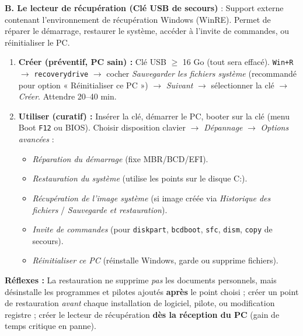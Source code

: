 \documentclass[11pt]{article}
\begin{document}
\begin{methode}
\textbf{B. Le lecteur de récupération (Clé USB de secours)} : Support externe contenant l'environnement de récupération Windows (WinRE). Permet de réparer le démarrage, restaurer le système, accéder à l'invite de commandes, ou réinitialiser le PC.
\begin{enumerate}
  \item \textbf{Créer (préventif, PC sain) :} Clé USB $\ge$ 16 Go (tout sera effacé). \texttt{Win+R} $\rightarrow$ \texttt{recoverydrive} $\rightarrow$ cocher \emph{Sauvegarder les fichiers système} (recommandé pour option « Réinitialiser ce PC ») $\rightarrow$ \emph{Suivant} $\rightarrow$ sélectionner la clé $\rightarrow$ \emph{Créer}. Attendre 20--40 min.
  \item \textbf{Utiliser (curatif) :} Insérer la clé, démarrer le PC, booter sur la clé (menu Boot \texttt{F12} ou BIOS). Choisir disposition clavier $\rightarrow$ \emph{Dépannage} $\rightarrow$ \emph{Options avancées} :
        \begin{itemize}
          \item \emph{Réparation du démarrage} (fixe MBR/BCD/EFI).
          \item \emph{Restauration du système} (utilise les points sur le disque C:).
          \item \emph{Récupération de l'image système} (si image créée via \emph{Historique des fichiers} / \emph{Sauvegarde et restauration}).
          \item \emph{Invite de commandes} (pour \texttt{diskpart}, \texttt{bcdboot}, \texttt{sfc}, \texttt{dism}, \texttt{copy} de secours).
          \item \emph{Réinitialiser ce PC} (réinstalle Windows, garde ou supprime fichiers).
        \end{itemize}
\end{enumerate}

\textbf{Réflexes :} La restauration ne supprime \emph{pas} les documents personnels, mais désinstalle les programmes et pilotes ajoutés \textbf{après} le point choisi ; créer un point de restauration \emph{avant} chaque installation de logiciel, pilote, ou modification registre ; créer le lecteur de récupération \textbf{dès la réception du PC} (gain de temps critique en panne).
\end{methode}
\end{document}
